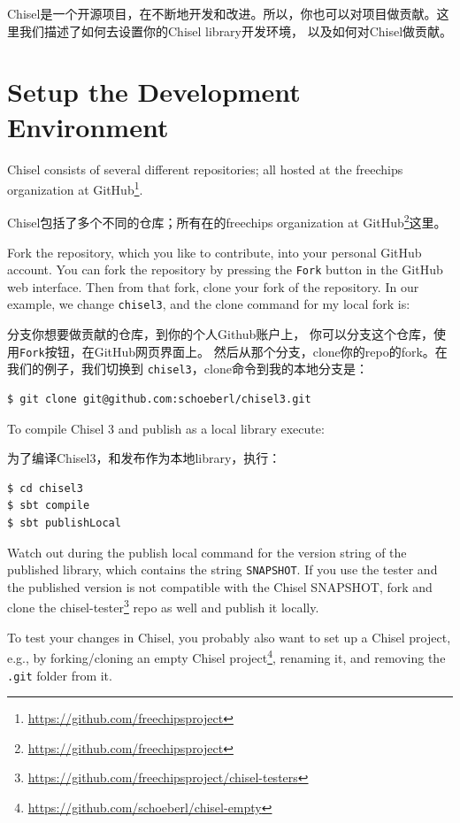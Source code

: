 \documentclass[%
    10pt,
    headinclude, footexclude,
    openright, %
    notitlepage,
    cleardoubleempty,
    headsepline,
    pointlessnumbers,
    bibtotoc, idxtotoc,
    ]{scrbook}
\newcommand{\code}[1]{{\small{\texttt{#1}}}}
\newcommand{\myref}[2]{\href{#1}{#2}}
\renewcommand{\myref}[2]{{#2}{\footnote{\url{#1}}}}
\begin{document}
Chisel是一个开源项目，在不断地开发和改进。所以，你也可以对项目做贡献。这里我们描述了如何去设置你的Chisel library开发环境，
以及如何对Chisel做贡献。

\section{Setup the Development Environment}

Chisel consists of several different repositories; all hosted at
the \myref{https://github.com/freechipsproject}{freechips organization at GitHub}.

Chisel包括了多个不同的仓库；所有在的\myref{https://github.com/freechipsproject}{freechips organization at GitHub}这里。

Fork the repository, which you like to contribute, into your personal GitHub account.
You can fork the repository by pressing the \code{Fork} button in the GitHub web interface.
Then from that fork, clone your fork of the repository. In our example, we change
\code{chisel3}, and the clone command for my local fork is:

分支你想要做贡献的仓库，到你的个人Github账户上，
你可以分支这个仓库，使用\code{Fork}按钮，在GitHub网页界面上。
然后从那个分支，clone你的repo的fork。在我们的例子，我们切换到
\code{chisel3}，clone命令到我的本地分支是：

\begin{verbatim}
$ git clone git@github.com:schoeberl/chisel3.git
\end{verbatim}

To compile Chisel 3 and publish as a local library execute:

为了编译Chisel3，和发布作为本地library，执行：

\begin{verbatim}
$ cd chisel3
$ sbt compile
$ sbt publishLocal
\end{verbatim}

Watch out during the publish local command for the version string of the published
library, which contains the string \code{SNAPSHOT}.
If you use the tester and the published version is not compatible with the Chisel
SNAPSHOT, fork and clone the \myref{https://github.com/freechipsproject/chisel-testers}{chisel-tester}
repo as well and publish it locally.


To test your changes in Chisel, you probably also want to set up a Chisel project,
e.g., by forking/cloning an \myref{https://github.com/schoeberl/chisel-empty}{empty Chisel project},
renaming it, and removing the \code{.git} folder from it.
\end{document}
